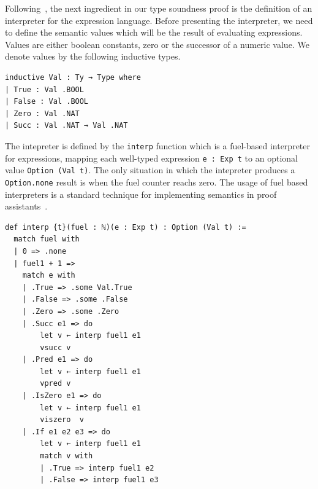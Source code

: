 \documentclass[preprint,12pt]{elsarticle}
\theoremstyle{definition}
\begin{document}
Following~\cite{Amin17}, the next ingredient in our type soundness proof is
the definition of an interpreter for the expression language. Before presenting
the interpreter, we need to define the semantic values which will be the
result of evaluating expressions. Values are either boolean constants,
zero or the successor of a numeric value. We denote values by the following
inductive types.
\begin{lstlisting}
inductive Val : Ty → Type where
| True : Val .BOOL
| False : Val .BOOL
| Zero : Val .NAT
| Succ : Val .NAT → Val .NAT
\end{lstlisting}
The intepreter is defined by the \lstinline|interp| function which is a
fuel-based interpreter for expressions, mapping each well-typed
expression \lstinline|e : Exp t| to an optional value
\lstinline|Option (Val t)|. The only situation in which the intepreter
produces a \lstinline|Option.none| result is when the fuel counter reachs
zero. The usage of fuel based interpreters is a standard technique for
implementing semantics in proof assistants~\cite{Amin17}.

\begin{lstlisting}
def interp {t}(fuel : ℕ)(e : Exp t) : Option (Val t) :=
  match fuel with
  | 0 => .none
  | fuel1 + 1 =>
    match e with
    | .True => .some Val.True
    | .False => .some .False
    | .Zero => .some .Zero
    | .Succ e1 => do
        let v ← interp fuel1 e1
        vsucc v
    | .Pred e1 => do
        let v ← interp fuel1 e1
        vpred v
    | .IsZero e1 => do
        let v ← interp fuel1 e1
        viszero  v
    | .If e1 e2 e3 => do
        let v ← interp fuel1 e1
        match v with
        | .True => interp fuel1 e2
        | .False => interp fuel1 e3
\end{lstlisting}
\end{document}
